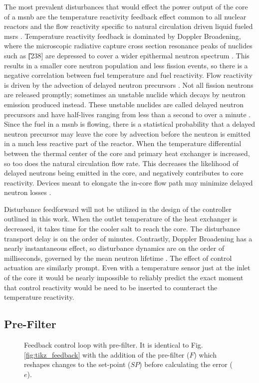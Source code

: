 The most prevalent disturbances that would effect the power output of the core of a \acs{msnb} are the temperature reactivity feedback effect common to all nuclear reactors and the flow reactivity specific to natural circulation driven  liquid fueled \acsp{msr} \cite{CarterNumerical}. Temperature reactivity feedback is dominated by Doppler Broadening, where the microscopic radiative capture cross section resonance peaks of nuclides such as \U[238] are depressed to cover a wider epithermal neutron spectrum \cite[Ch. 6]{DH}. This results in a smaller core neutron population and less fission events, so there is a negative correlation between fuel temperature and fuel reactivity. Flow reactivity is driven by the advection of delayed neutron precursors \cite[Ch. 3]{Kerlin}. Not all fission neutrons are released promptly; sometimes an unstable nuclide which decays by neutron emission produced instead. These unstable nuclides are called delayed neutron precursors and have half-lives ranging from less than a second to over a minute \cite[Ch. 7]{Lamarsh}. Since the fuel in a \acs{msnb} is flowing, there is a statistical probability that a delayed neutron precursor may leave the core by advection before the neutron is emitted in a much less reactive part of the reactor. When the temperature differential between the thermal center of the core and primary heat exchanger is increased, so too does the natural circulation flow rate. This decreases the likelihood of delayed neutrons being emitted in the core, and negatively contributes to core reactivity. Devices meant to elongate the in-core flow path may minimize delayed neutron losses \cite{CarterPHD}.

Disturbance feedforward will not be utilized in the design of the controller outlined in this work. When the outlet temperature of the heat exchanger is decreased, it takes time for the cooler salt to reach the core. The disturbance transport delay is on the order of minutes. Contrastly, Doppler Broadening has a nearly instantaneous effect, so disturbance dynamics are on the order of milliseconds, governed by the mean neutron lifetime \cite[Ch. 7]{Lamarsh}. The effect of control actuation are similarly prompt. Even with a temperature sensor just at the inlet of the core it would be nearly impossible to reliably predict the exact moment that control reactivity would be need to be inserted to counteract the temperature reactivity. 

\subsection{Pre-Filter}
\begin{figure}[!ht]
    \centering
    
    \caption[Feedback control loop with pre-filter]{Feedback control loop with pre-filter. It is identical to Fig. \ref{fig:tikz_feedback} with the addition of the pre-filter ($F$) which reshapes changes to the set-point ($SP$) before calculating the error ($e$).}
    \label{fig:tikz_prefilter}
\end{figure}

